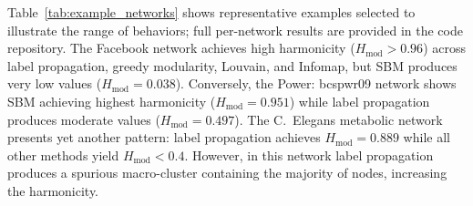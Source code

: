 \documentclass[twocolumn,superscriptaddress,tightenlines,aps,prx,floatfix]{revtex4-2}
\begin{document}
\begin{bibunit}
Table~\ref{tab:example_networks} shows representative examples selected to illustrate the range of behaviors; full per-network results are provided in the code repository. 
The Facebook network achieves high harmonicity ($H_{\text{mod}} > 0.96$) across label propagation, greedy modularity, Louvain, and Infomap, but SBM produces very low values ($H_{\text{mod}} = 0.038$). Conversely, the Power: bcspwr09 network shows SBM achieving highest harmonicity ($H_{\text{mod}} = 0.951$) while label propagation produces moderate values ($H_{\text{mod}} = 0.497$). The C.~Elegans metabolic network presents yet another pattern: label propagation achieves $H_{\text{mod}} = 0.889$ while all other methods yield $H_{\text{mod}} < 0.4$. However, in this network label propagation produces a spurious macro-cluster containing the majority of nodes, increasing the harmonicity.


\end{bibunit}
\end{document}
